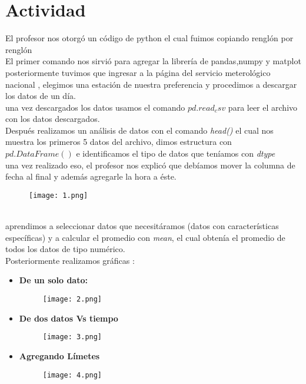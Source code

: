 \documentclass{article}
\begin{document}
\section{Actividad}
El profesor nos otorgó un código de python el cual fuimos copiando renglón por renglón\\
El primer comando nos sirvió para agregar  la librería de pandas,numpy y matplot
posteriormente tuvimos que ingresar a la página del servicio meterológico nacional , elegimos una estación de nuestra preferencia y procedimos a descargar los datos de un día.\\
una vez descargados los datos usamos el comando \textit{$pd.read_csv$} para leer el archivo con los datos descargados.\\
Después realizamos un análisis de datos con el comando \textit{head()} el cual nos muestra los primeros 5 datos del archivo, dimos estructura con \textit{$pd.DataFrame()$}
e identificamos el tipo de datos que teníamos con \textit{dtype}\\
una vez realizado eso, el profesor nos explicó que debíamos mover la columna de fecha al final y además agregarle la hora a éste.
\begin{figure}[h!]
\centering
\texttt{[image: 1.png]}
\end{figure}
\\aprendimos a seleccionar datos que necesitáramos (datos con características específicas) y a calcular el promedio con \textit{mean}, el cual obtenía el promedio de todos los datos de tipo numérico.\\

Posteriormente realizamos gráficas :
\begin{itemize}
\item \textbf{De un solo dato:}
\begin{figure}[h!]
\centering
\texttt{[image: 2.png]}
\end{figure}
\newpage
\item \textbf{De dos datos Vs tiempo}
\begin{figure}[h!]
\centering
\texttt{[image: 3.png]}
\end{figure}
\newpage
\item \textbf{Agregando Límetes}
\begin{figure}[h!]
\centering
\texttt{[image: 4.png]}
\end{figure}
\end{itemize}
\end{document}
